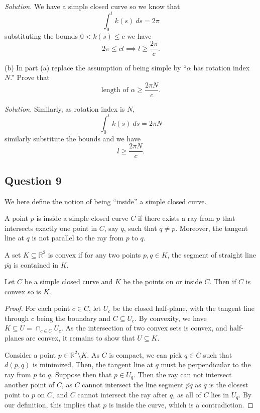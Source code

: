 \documentclass[12pt]{article}
\begin{document}
\textit{Solution.}
We have a simple closed curve so we know that
\[ \int_0^l k(s)\ ds = 2\pi \]
substituting the bounds \(0<k(s)\leq c\) we have
\[ 2\pi \leq cl \implies l \geq \frac{2\pi}c. \]

(b) In part (a) replace the assumption of being simple by ``\(\alpha\) has rotation index \(N\).'' Prove that
\[ \text{length of }\alpha \geq \frac{2\pi N}c. \]

\textit{Solution.}
Similarly, as rotation index is \(N\),
\[ \int_0^l k(s)\ ds = 2\pi N \]
similarly substitute the bounds and we have
\[ l \geq \frac{2\pi N}c. \]

\subsection*{Question 9}

We here define the notion of being ``inside'' a simple closed curve.

\begin{definition}
    A point $p$ is inside a simple closed curve $C$ if there
    exists a ray from $p$ that intersects exactly one point in $C$, say $q$,
    such that $q \neq p$. Moreover, the tangent line at $q$
    is not parallel to the ray from $p$ to $q$.
\end{definition}

\begin{theorem}
    A set $K \subseteq \mathbb R^2$ is convex
    if for any two points $p, q \in K$, the segment of 
    straight line $\overline{pq}$ is contained in $K$. 

    Let $C$ be a simple closed curve and $K$ be the points on or inside $C$.
    Then if $C$ is convex so is $K$.
\end{theorem}

\begin{proof}
    For each point $c \in C$, let $U_c$ be the closed half-plane, 
    with the tangent line through $c$ being the boundary and
    $C \subseteq U_c$. By convexity, we have $K \subseteq U = \cap_{c \in C} U_c.$
    As the intersection of two convex sets is convex, and half-planes are convex,
    it remains to show that $U \subseteq K$.

    Consider a point $p \in \mathbb{R}^2 \setminus K$.
    As $C$ is compact, we can pick $q \in C$ such that $d(p, q)$ is minimized.
    Then, the tangent line at $q$ must be perpendicular to the ray from $p$ to $q$.
    Suppose then that $p \in U_q$. Then the ray can not intersect another point of $C$,
    as $C$ cannot intersect the line segment $\overline{pq}$ as $q$ is the closest point to $p$ on $C$,
    and $C$ cannot intersect the ray after $q$, as all of $C$ lies in $U_q.$
    By our definition, this implies that $p$ is inside the curve, which is a contradiction.
\end{proof}
\end{document}

